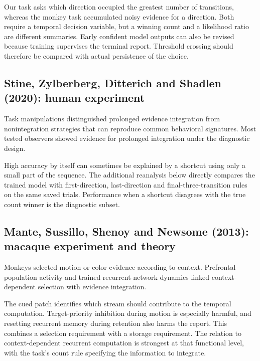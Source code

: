 \documentclass[11pt]{article}
\begin{document}
Our task asks which direction occupied the greatest number of transitions, whereas the monkey task accumulated noisy evidence for a direction. Both require a temporal decision variable, but a winning count and a likelihood ratio are different summaries. Early confident model outputs can also be revised because training supervises the terminal report. Threshold crossing should therefore be compared with actual persistence of the choice.

\subsection{Stine, Zylberberg, Ditterich and Shadlen (2020): human experiment}
Task manipulations distinguished prolonged evidence integration from nonintegration strategies that can reproduce common behavioral signatures. Most tested observers showed evidence for prolonged integration under the diagnostic design. \cite{bio_stine}

High accuracy by itself can sometimes be explained by a shortcut using only a small part of the sequence. The additional reanalysis below directly compares the trained model with first-direction, last-direction and final-three-transition rules on the same saved trials. Performance when a shortcut disagrees with the true count winner is the diagnostic subset.

\subsection{Mante, Sussillo, Shenoy and Newsome (2013): macaque experiment and theory}
Monkeys selected motion or color evidence according to context. Prefrontal population activity and trained recurrent-network dynamics linked context-dependent selection with evidence integration. \cite{bio_mante}

The cued patch identifies which stream should contribute to the temporal computation. Target-priority inhibition during motion is especially harmful, and resetting recurrent memory during retention also harms the report. This combines a selection requirement with a storage requirement. The relation to context-dependent recurrent computation is strongest at that functional level, with the task’s count rule specifying the information to integrate.
\end{document}
